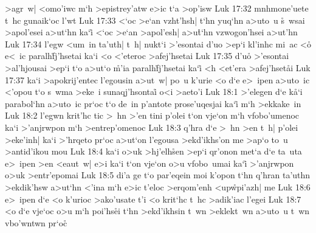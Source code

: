 >agr~w|
<omo'iwc
m`h
>epistrey'atw
e>ic
t`a
>op'isw\bibvsend
\vs Luk 17:32
mnhmone'uete
t~hc
gunaik`oc
l'wt\bibvsend
\vs Luk 17:33
<`oc
>e`an
vzht'hsh|
t`hn
yuq`hn
a>uto~u
\r{s}~wsai
>apol'esei
a>ut`hn
ka`i\r{}
<`oc
>e`an
>apol'esh|
a>u\r{t}`hn
vzwogon'hsei
a>ut'hn\bibvsend
\vs Luk 17:34
l'egw
<um~in
ta'uth|
t~h|
nukt`i
>'esontai
d'uo
>ep`i
kl'inhc
mi~ac
<o\r{}
e<~ic
paralh\r{f}j'hsetai
ka`i
<o
<'eteroc
>afej'hsetai\bibvsend
\vs Luk 17:35
d'uo\r{}
>'esontai
>al'hjousai
>ep`i
t`o
a>ut`o
\r{m}'ia
paralh\r{f}j'hsetai
ka`i\r{}
<h
<et'era
>afej'hset\r{a}i\bibvsend
{}
\vs Luk 17:37
ka`i
>apokrij'entec
l'egousin
a>ut~w|
po~u
k'urie
<o
d`e
e>~ipen
a>uto~ic
<'opou
t`o
s~wma
>eke~i
sunaqj'hsontai\r{}
o<i
>aeto'i\bibvsend
\vs Luk 18:1
>'elegen
d`e
k\r{a}`i
parabol`hn
a>uto~ic
pr`oc
t`o
de~in
p'antote
prose'uqesjai
ka`i\r{}
m`h
>ekkake~in\bibvsend
\vs Luk 18:2
l'egwn
krit'hc
tic
>~hn
>'en
tini
p'olei
t`on
vje`on
m`h
vfobo'umenoc
ka`i
>'anjrwpon
m`h
>entrep'omenoc\bibvsend
\vs Luk 18:3
q'hra
d`e
>~hn
>en
t~h|
p'olei
>eke'inh|
ka`i
>'hrqeto
pr`oc
a>ut`on
l'egousa
>ekd'ikhs'on
me
>ap`o
to~u
>antid'ikou
mou\bibvsend
\vs Luk 18:4
ka`i
o>uk
>hj'elh\r{s}en
>ep`i
qr'onon
met`a
d`e
ta~uta
e>~ipen
>en
<eaut~w|
e>i
ka`i
t`on
vje`on
o>u
vfobo~umai
ka`i\r{}
>'anjrwpon
o>uk
>entr'epomai\bibvsend
\vs Luk 18:5
di'a
ge
t`o
par'eqein
moi
k'opon
t`hn
q'hran
ta'uthn
>ekdik'hsw
a>ut`hn
<'ina
m`h
e>ic
t'eloc
>erqom'enh
<up\r{w}pi'azh|
me\bibvsend
\vs Luk 18:6
e>~ipen
d`e
<o
k'urioc
>ako'usate
t'i
<o
krit`hc
t~hc
>adik'iac
l'egei\bibvsend
\vs Luk 18:7
<o
d`e
vje`oc
o>u
m`h
poi'hs\r{e}i
t`hn
>ekd'ikhsin
t~wn
>eklekt~wn
a>uto~u
t~wn
vbo'wntwn
pr`oc\r{}

